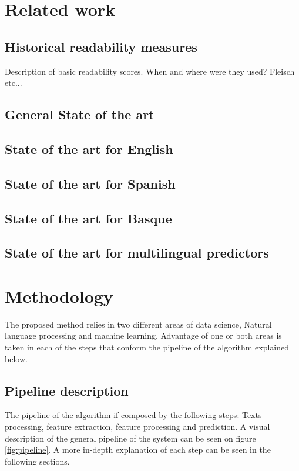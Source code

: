 \documentclass[12pt]{article}
\begin{document}
\section{Related work}
\subsection{Historical readability measures}
Description of basic readability scores. When and where were they used? Fleisch etc...
\subsection{General State of the art}

\subsection{State of the art for English}
\subsection{State of the art for Spanish}
\subsection{State of the art for Basque}

\subsection{State of the art for multilingual predictors}

\section{Methodology}
The proposed method relies in two different areas of data science, Natural language processing and machine learning. Advantage of one or both areas is taken in each of the steps that conform the pipeline of the algorithm explained below.
\subsection{Pipeline description}
The pipeline of the algorithm if composed by the following steps: Texts processing, feature extraction, feature processing and prediction. A visual description of the general pipeline of the system can be seen on figure \ref{fig:pipeline}.  A more in-depth explanation of each step can be seen in the following sections.
\end{document}
